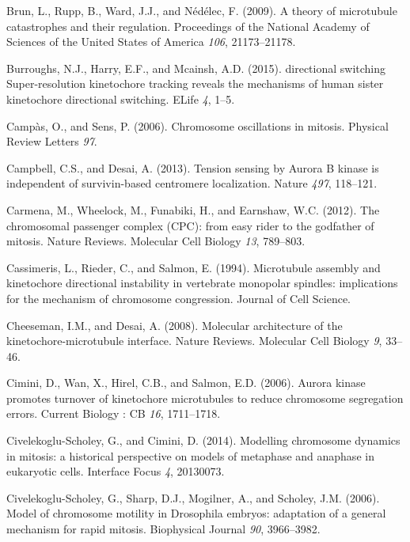 \documentclass[12pt,a4paper,twoside,openright]{book}
\begin{document}
\hypertarget{ref-Brun2009}{}
Brun, L., Rupp, B., Ward, J.J., and Nédélec, F. (2009). A theory of
microtubule catastrophes and their regulation. Proceedings of the
National Academy of Sciences of the United States of America \emph{106},
21173--21178.

\hypertarget{ref-Burroughs2015}{}
Burroughs, N.J., Harry, E.F., and Mcainsh, A.D. (2015). directional
switching Super-resolution kinetochore tracking reveals the mechanisms
of human sister kinetochore directional switching. ELife \emph{4}, 1--5.

\hypertarget{ref-Campas2006}{}
Campàs, O., and Sens, P. (2006). Chromosome oscillations in mitosis.
Physical Review Letters \emph{97}.

\hypertarget{ref-Campbell2013a}{}
Campbell, C.S., and Desai, A. (2013). Tension sensing by Aurora B kinase
is independent of survivin-based centromere localization. Nature
\emph{497}, 118--121.

\hypertarget{ref-Carmena2012a}{}
Carmena, M., Wheelock, M., Funabiki, H., and Earnshaw, W.C. (2012). The
chromosomal passenger complex (CPC): from easy rider to the godfather of
mitosis. Nature Reviews. Molecular Cell Biology \emph{13}, 789--803.

\hypertarget{ref-Cassimeris1994}{}
Cassimeris, L., Rieder, C., and Salmon, E. (1994). Microtubule assembly
and kinetochore directional instability in vertebrate monopolar
spindles: implications for the mechanism of chromosome congression.
Journal of Cell Science.

\hypertarget{ref-Cheeseman2008}{}
Cheeseman, I.M., and Desai, A. (2008). Molecular architecture of the
kinetochore-microtubule interface. Nature Reviews. Molecular Cell
Biology \emph{9}, 33--46.

\hypertarget{ref-Cimini2006}{}
Cimini, D., Wan, X., Hirel, C.B., and Salmon, E.D. (2006). Aurora kinase
promotes turnover of kinetochore microtubules to reduce chromosome
segregation errors. Current Biology : CB \emph{16}, 1711--1718.

\hypertarget{ref-Civelekoglu-Scholey2014}{}
Civelekoglu-Scholey, G., and Cimini, D. (2014). Modelling chromosome
dynamics in mitosis: a historical perspective on models of metaphase and
anaphase in eukaryotic cells. Interface Focus \emph{4}, 20130073.

\hypertarget{ref-Civelekoglu-Scholey2006}{}
Civelekoglu-Scholey, G., Sharp, D.J., Mogilner, A., and Scholey, J.M.
(2006). Model of chromosome motility in Drosophila embryos: adaptation
of a general mechanism for rapid mitosis. Biophysical Journal \emph{90},
3966--3982.
\end{document}
